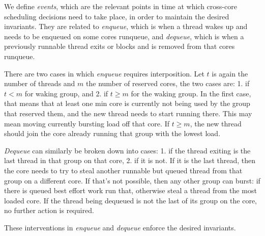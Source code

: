 We define \textit{events}, which are the relevant points in time at which
cross-core scheduling decisions need to take place, in order to maintain the
desired invariants. They are related to \textit{enqueue}, which is when a thread
wakes up and needs to be enqueued on some cores runqueue, and \textit{dequeue},
which is when a previously runnable thread exits or blocks and is removed from
that cores runqueue.

There are two cases in which \textit{enqueue} requires interposition. Let $t$ is
again the number of threads and $m$ the number of reserved cores, the two cases
are: 1. if $t < m$ for waking group, and 2. if $t \geq m$ for the waking group.
In the first case, that means that at least one min core is currently not being
used by the group that reserved them, and the new thread needs to start running
there. This may mean moving currently bursting load off that core. If $t \geq
m$, the new thread should join the core already running that group with the
lowest load.

\textit{Dequeue} can similarly be broken down into cases: 1. if the thread
exiting is the last thread in that group on that core, 2. if it is not. If it is
the last thread, then the core needs to try to steal another runnable but queued
thread from that group on a different core. If that's not possible, then any
other group can burst: if there is queued best effort work run that, otherwise
steal a thread from the most loaded core. If the thread being dequeued is not
the last of its group on the core, no further action is required.

These interventions in \textit{enqueue} and \textit{dequeue} enforce the desired
invariants.




